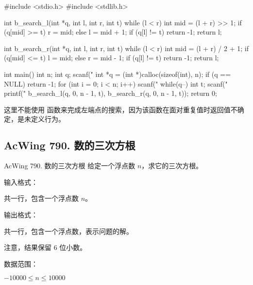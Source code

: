 \begin{mycpptwocol}
    #include <stdio.h>
    #include <stdlib.h>

    int b_search_l(int *q, int l,
    int r, int t) {
        while (l < r) {
            int mid = (l + r) >> 1;
            if (q[mid] >= t) {
                r = mid;
            } else {
                l = mid + 1;
            }
        }
        if (q[l] != t) {
            return -1;
        }
        return l;
    }

    int b_search_r(int *q, int l,
    int r, int t) {
        while (l < r) {
            int mid = (l + r) / 2 + 1;
            if (q[mid] <= t) {
                l = mid;
            } else {
                r = mid - 1;
            }
        }
        if (q[l] != t) {
            return -1;
        }
        return l;
    }

    int main() {
        int n;
        int q;
        scanf("%
        int *q = (int *)calloc(sizeof(int), n);
        if (q == NULL) {
            return -1;
        }
        for (int i = 0; i < n; i++) {
            scanf("%
        }
        while(q--) {
            int t;
            scanf("%
            printf("%
            b_search_l(q, 0, n - 1, t),
            b_search_r(q, 0, n - 1, t));
        }
        return 0;
    }
\end{mycpptwocol}

\begin{exclamation}
    这里不能使用 函数来完成左端点的搜索，因为该函数在面对重复值时返回值不确定，是未定义行为。
\end{exclamation}

\subsection{AcWing 790. 数的三次方根}
\begin{titledbox}{AcWing 790. 数的三次方根}
    给定一个浮点数 $n$，求它的三次方根。

    输入格式：

    共一行，包含一个浮点数 $n$。

    输出格式：

    共一行，包含一个浮点数，表示问题的解。

    注意，结果保留 $6$ 位小数。

    数据范围：

    $-10000 \le n \le 10000$

    \begin{inputblock}
    \end{inputblock}
    \begin{outputblock}
    \end{outputblock}
\end{titledbox}


